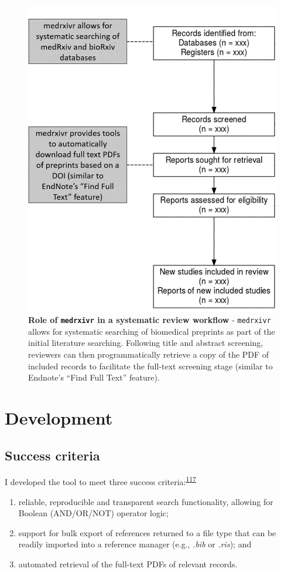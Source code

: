 \documentclass[a4paper, twoside]{templates/ociamthesis}
\begin{document}
\begin{figure}[h]

{\centering \includegraphics[width=0.65\linewidth]{figures/sys-rev-tools/medrxiv-role} 

}

\caption[Role of \texttt{medrxivr} in a systematic review workflow]{\textbf{Role of \texttt{medrxivr} in a systematic review workflow} - \texttt{medrxivr} allows for systematic searching of biomedical preprints as part of the initial literature searching. Following title and abstract screening, reviewers can then programmatically retrieve a copy of the PDF of included records to facilitate the full-text screening stage (similar to Endnote's ``Find Full Text'' feature).}\label{fig:medrxivr-sr}
\end{figure}

\hypertarget{development}{%
\section{Development}\label{development}}

\hypertarget{success-criteria}{%
\subsection{Success criteria}\label{success-criteria}}

I developed the tool to meet three success criteria:\textsuperscript{\protect\hyperlink{ref-wateridge1995}{117}}

\begin{enumerate}
\def\labelenumi{\arabic{enumi}.}
\item
  reliable, reproducible and transparent search functionality, allowing for Boolean (AND/OR/NOT) operator logic;
\item
  support for bulk export of references returned to a file type that can be readily imported into a reference manager (e.g., \emph{.bib} or \emph{.ris}); and
\item
  automated retrieval of the full-text PDFs of relevant records.
\end{enumerate}
\end{document}
